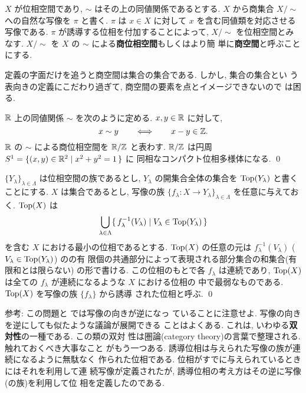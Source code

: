 \documentclass[12pt,twoside]{jarticle}
\def\Top{\mathop{\text{\rm Top}}\nolimits}
\def\Z{{\Bbb Z}} %
\def\R{{\Bbb R}} %
\begin{document}
$X$ が位相空間であり, $\sim$ はその上の同値関係であるとする. %
$X$ から商集合 $X/{\sim}$ への自然な写像を $\pi$ と書く. %
$\pi$ は $x\in X$ に対して $x$ を含む同値類を対応させる写像である. %
$\pi$ が誘導する位相を付加することによって, $X/{\sim}$ を位相空間とみ
なす. $X/{\sim}$ を $X$ の $\sim$ による{\bf 商位相空間}もしくはより簡
単に{\bf 商空間}と呼ぶことにする.

定義の字面だけを追うと商空間は集合の集合である. しかし, 集合の集合とい
う表向きの定義にこだわり過ぎて, 商空間の要素を点とイメージできないので
は困る. 

\begin{question}
  $\R$ 上の同値関係 $\sim$ を次のように定める. $x, y \in \R$ に対して,
  \[
    x \sim y
    \qquad\Longleftrightarrow\qquad
    x - y \in \Z.
  \]%
  $\R$ の $\sim$ による商位相空間を $\R/\Z$ と表わす. %
  $\R/\Z$ は円周 $S^1 = \{ (x,y) \in \R^2 \mid x^2 + y^2 = 1 \,\}$ に
  同相なコンパクト位相多様体になる. \qed
\end{question}

\begin{question}[誘導位相2]
  $\{Y_\lambda\}_{\lambda\in\Lambda}$ は位相空間の族であるとし,
  $Y_\lambda$ の開集合全体の集合を $\Top(Y_\lambda)$ と書くことにする. 
  $X$ は集合であるとし, %
  写像の族 $\{f_\lambda \colon X \to Y_\lambda\}_{\lambda\in\Lambda}$ %
  を任意に与えておく. $\Top(X)$ は
  \[
    \bigcup_{\lambda\in\Lambda}
    \{\,
      f_\lambda^{-1}(V_\lambda)
    \mid
      V_\lambda \in \Top(Y_\lambda)
    \,\}
  \] %
  を含む $X$ における最小の位相であるとする. $\Top(X)$ の任意の元は 
  $f_\lambda^{-1}(V_\lambda)$ ($V_\lambda \in \Top(Y_\lambda)$) のの有
  限個の共通部分によって表現される部分集合の和集合(有限和とは限らない)
  の形で書ける. この位相のもとで各 $f_\lambda$ は連続であり, %
  $\Top(X)$ は全ての $f_\lambda$ が連続になるような $X$ における位相の
  中で最弱なものである. $\Top(X)$ を写像の族 $\{f_\lambda\}$ から誘導
  された位相と呼ぶ. \qed
\end{question}

\noindent 参考: この問題と  では写像の向きが逆になっ
ていることに注意せよ. 写像の向きを逆にしても似たような議論が展開できる
ことはよくある. これは, いわゆる{\bf 双対性}の一種である. この類の双対
性は圏論(category theory)の言葉で整理される. 触れておくべき大事なこと
がもう一つある. 誘導位相は与えられた写像の族が連続になるように無駄なく
作られた位相である. 位相がすでに与えられているときにはそれを利用して連
続写像が定義されたが, 誘導位相の考え方はその逆に写像(の族)を利用して位
相を定義したのである.
\end{document}
